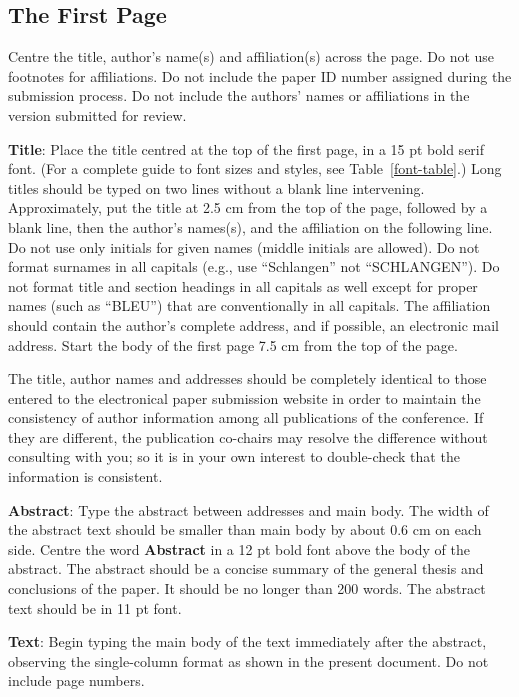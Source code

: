 \documentclass[11pt]{article}
\begin{document}
\subsection{The First Page}
\label{ssec:first}

Centre the title, author's name(s) and affiliation(s) across
the page. Do not use footnotes for affiliations. Do not include the paper ID number assigned during the submission process. Do not include the authors' names or affiliations in the version submitted for review.

\textbf{Title}: Place the title centred at the top of the first page, in a 15 pt bold serif font. (For a complete guide to font sizes and styles, see Table~\ref{font-table}.) Long titles should be typed on two lines without a blank line intervening. Approximately, put the title at 2.5 cm from the top of the page, followed by a blank line, then the author's names(s), and the affiliation on the following line. Do not use only initials for given names (middle initials are allowed). Do not format surnames in all capitals (e.g., use ``Schlangen'' not ``SCHLANGEN''). Do not format title and section headings in all
capitals as well except for proper names (such as ``BLEU'') that are conventionally in all capitals. The affiliation should contain the author's complete address, and if possible, an electronic mail address. Start the body of the first page 7.5 cm from the top of the page.

The title, author names and addresses should be completely identical to those entered to the electronical paper submission website in order to maintain the consistency of author information among all publications of the conference. If they are different, the publication co-chairs may resolve the difference without consulting with you; so it is in your own interest to double-check that the information is consistent.

\textbf{Abstract}: Type the abstract between addresses and main body. The width of the abstract text should be smaller than main body by about 0.6 cm on each side. Centre the word \textbf{Abstract} in a 12 pt bold font above the body of the abstract. The abstract should be a concise summary of the general thesis and conclusions of the paper. It should be no longer than 200 words. The abstract text should be in 11 pt font.

\textbf{Text}: Begin typing the main body of the text immediately after the abstract, observing the single-column format as shown in the present document. Do not include page numbers.
\end{document}
